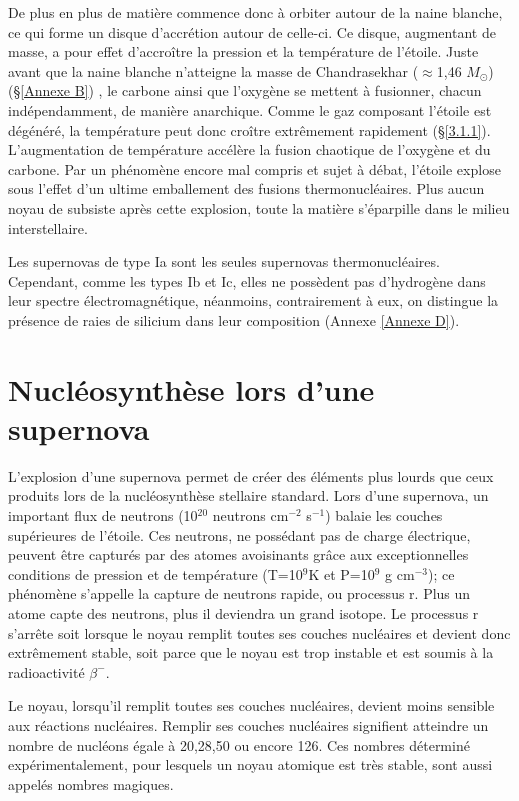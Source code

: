 De plus en plus de matière commence donc à orbiter autour de la naine blanche, ce qui forme un disque d'accrétion autour de celle-ci. Ce disque, augmentant de masse, a pour effet d'accroître la pression et la température de l'étoile. Juste avant que la naine blanche n'atteigne la masse de Chandrasekhar ($\approx$1,46 $M_\odot$)(§\ref{Annexe B}) 
 , le carbone ainsi que l'oxygène se mettent à fusionner, chacun indépendamment, de manière anarchique. Comme le gaz composant l'étoile est dégénéré, la température peut donc croître extrêmement rapidement (§\ref{3.1.1}). L'augmentation de température accélère la fusion chaotique de l'oxygène et du carbone. Par un phénomène encore mal compris et sujet à débat, l'étoile explose sous l'effet d'un ultime emballement des fusions thermonucléaires. Plus aucun noyau de subsiste après cette explosion, toute la matière s'éparpille dans le milieu interstellaire.\smallskip
 
 Les supernovas de type Ia sont les seules supernovas thermonucléaires. Cependant, comme les types Ib et Ic, elles ne possèdent pas d'hydrogène dans leur spectre électromagnétique, néanmoins, contrairement à eux, on distingue la présence de raies de silicium dans leur composition (Annexe \ref{Annexe D}). 
 
 \section{Nucléosynthèse lors d'une supernova}\label{3.2} 
 
 L'explosion d'une supernova permet de créer des éléments plus lourds que ceux produits lors de la nucléosynthèse stellaire standard. Lors d'une supernova, un important flux de neutrons (10$^{20}$ neutrons cm$^{-2}$ s$^{-1}$) balaie les couches supérieures de l'étoile. Ces neutrons, ne possédant pas de charge électrique, peuvent être capturés par des atomes avoisinants grâce aux exceptionnelles conditions de pression et de température (T=10$^{9}$K et P=10$^{9}$ g cm$^{-3}$); ce phénomène s'appelle la capture de neutrons rapide, ou processus r\footnotemark[2]. 
 Plus un atome capte des neutrons, plus il deviendra un grand isotope. Le processus r s'arrête soit lorsque le noyau remplit toutes ses couches nucléaires et devient donc extrêmement stable, soit parce que le noyau est trop instable et est soumis à la radioactivité $\beta^{-}$.\smallskip
 
 Le noyau, lorsqu'il remplit toutes ses couches nucléaires, devient moins sensible aux réactions nucléaires. Remplir ses couches nucléaires signifient atteindre un nombre de nucléons égale à 20,28,50 ou encore 126. Ces nombres déterminé expérimentalement, pour lesquels un noyau atomique est très stable, sont aussi appelés nombres magiques.\smallskip 
 
